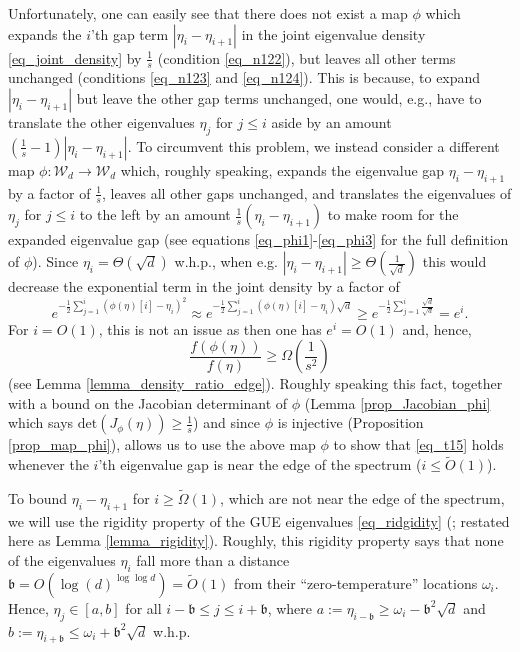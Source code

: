 \documentclass[11pt,letterpaper]{article}
\begin{document}
%
Unfortunately, one can easily see that there does not exist a map $\phi$ which expands the $i$'th gap term $|\eta_i-\eta_{i+1}|$ in the joint eigenvalue density  \eqref{eq_joint_density} by $\frac{1}{s}$ (condition \eqref{eq_n122}), but leaves all other terms unchanged (conditions \eqref{eq_n123} and \eqref{eq_n124}).
%
This is because, to expand $|\eta_i-\eta_{i+1}|$ but leave the other gap terms unchanged, one would, e.g., have to translate the other eigenvalues  $\eta_j$ for $j \leq i$ aside by an amount  $(\frac{1}{s}-1)|\eta_i-\eta_{i+1}|$.
%
To circumvent this problem, we instead consider a different map $\phi : \mathcal{W}_d \rightarrow \mathcal{W}_d$ which, roughly speaking, expands the eigenvalue gap $\eta_i-\eta_{i+1}$ by a factor of $\frac{1}{s}$, leaves all other gaps unchanged, and translates the eigenvalues of $\eta_j$ for $j \leq i$ to the left by an amount $\frac{1}{s}(\eta_i-\eta_{i+1})$ to make room for the expanded eigenvalue gap (see equations \eqref{eq_phi1}-\eqref{eq_phi3} for the full definition of $\phi$).
%
Since  $\eta_i = \Theta(\sqrt{d})$ w.h.p., when e.g. $|\eta_i-\eta_{i+1}| \geq \Theta(\frac{1}{\sqrt{d}})$ this would decrease the exponential term in the joint density by a factor of 
$$ e^{-\frac{1}{2} \sum_{j=1}^i (\phi(\eta)[i] - \eta_i)^2} \approx e^{-\frac{1}{2} \sum_{j=1}^i (\phi(\eta)[i] - \eta_i) \sqrt{d} } \geq  e^{-\frac{1}{2} \sum_{j=1}^i \frac{\sqrt{d}}{\sqrt{d}}} = e^i.$$
%
For $i = O(1)$, this is not an issue as then one has $e^i = O(1)$ and, hence,   $$ \frac{f(\phi(\eta))}{f(\eta)} \geq \Omega\left(\frac{1}{s^2}\right)$$ (see Lemma \ref{lemma_density_ratio_edge}).
%
Roughly speaking this fact, together with a bound on the Jacobian determinant of $\phi$ (Lemma \ref{prop_Jacobian_phi} which says  $\mathrm{det}(J_\phi(\eta)) \geq \frac{1}{s}$) and since $\phi$ is injective (Proposition \ref{prop_map_phi}), allows us to use the above map $\phi$ to show that \eqref{eq_t15} holds whenever the $i$'th eigenvalue gap is near the edge of the spectrum ($i \leq \tilde{O}(1)$).


%
To bound  $\eta_i-\eta_{i+1}$ for $i \geq \tilde{\Omega}(1)$, which are not near the edge of the spectrum, 
we will use the rigidity property of the GUE eigenvalues  \eqref{eq_ridgidity} 
(\cite{erdHos2012rigidity}; restated here as Lemma \ref{lemma_rigidity}).
%
Roughly, this rigidity property says that none of the eigenvalues $\eta_i$ fall more than a distance $\mathfrak{b} = O(\log(d)^{\log \log d}) = \tilde{O}(1)$ from their ``zero-temperature'' locations $\omega_i$.
%
Hence, $\eta_{j} \in [a,b]$ for all $i - \mathfrak{b} \leq j \leq i + \mathfrak{b}$,  where $a:=\eta_{i-\mathfrak{b}} \geq \omega_i - \mathfrak{b}^2\sqrt{d}$ and $b:= \eta_{i+\mathfrak{b}} \leq \omega_i + \mathfrak{b}^2\sqrt{d}$ w.h.p.
\end{document}
